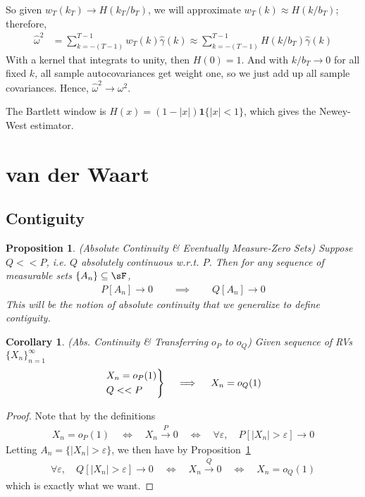 \documentclass[12pt]{article}
\theoremstyle{plain}
\newtheorem{prop}[thm]{Proposition}
\newtheorem{cor}[thm]{Corollary}
\theoremstyle{definition}
\theoremstyle{remark}
\newcommand{\ra}{\rightarrow}
\newcommand{\pto}{\xrightarrow{P}}
\newcommand{\ninf}{_{n=1}^\infty}
\begin{document}
So given $w_T(k_T)\ra H(k_T/b_T)$, we will approximate
$w_T(k)\approx H(k/b_T)$; therefore,
\begin{align*}
  \hat{\omega}^2
  &=
  \sum_{k=-(T-1)}^{T-1}
  w_T(k)
  \hat{\gamma}(k)
  \approx
  \sum_{k=-(T-1)}^{T-1}
  H(k/b_T)
  \hat{\gamma}(k)
\end{align*}
With a kernel that integrats to unity, then $H(0)=1$.
And with $k/b_T\ra 0$ for all fixed $k$, all sample autocovariances get
weight one, so we just add up all sample covariances. Hence,
$\hat{\omega}^2\ra\omega^2$.

The Bartlett window is $H(x)=(1-|x|)\mathbf{1}\{|x|<1\}$, which gives
the Newey-West estimator.




\clearpage
\section{van der Waart}


\clearpage
\subsection{Contiguity}

\begin{prop}
\label{prop:absconttransfer}
\emph{(Absolute Continuity \& Eventually Measure-Zero Sets)}
Suppose $Q<<P$, i.e. $Q$ absolutely continuous w.r.t. $P$.
Then for any sequence of measurable sets $\{A_n\}\subseteq \sF$,
\begin{align*}
  P[A_n] \ra 0
  \qquad\implies\qquad
  Q[A_n] \ra 0
\end{align*}
This will be the notion of absolute continuity that we generalize to
define contiguity.
\end{prop}
\begin{cor}
\emph{(Abs. Continuity \& Transferring $o_P$ to $o_Q$)}
Given sequence of RVs $\{X_n\}\ninf$
\begin{align*}
  \begin{rcases}
    X_n = o_P(1) \\
    Q<<P \\
  \end{rcases}
  \quad\implies\quad
  X_n=o_Q(1)
\end{align*}
\end{cor}
\begin{proof}
Note that by the definitions
\begin{align*}
  X_n = o_P(1)
  \quad\iff\quad
  X_n \pto 0
  \quad\iff\quad
  \forall \varepsilon,\quad
  P[|X_n|>\varepsilon]\ra 0
\end{align*}
Letting $A_n=\{|X_n|>\varepsilon\}$, we then have by
Proposition~\ref{prop:absconttransfer}
\begin{align*}
  \forall \varepsilon,\quad
  Q[|X_n|>\varepsilon] \ra 0
  \quad\iff\quad
  X_n \overset{Q}{\ra} 0
  \quad\iff\quad
  X_n = o_Q(1)
\end{align*}
which is exactly what we want.
\end{proof}
\end{document}
